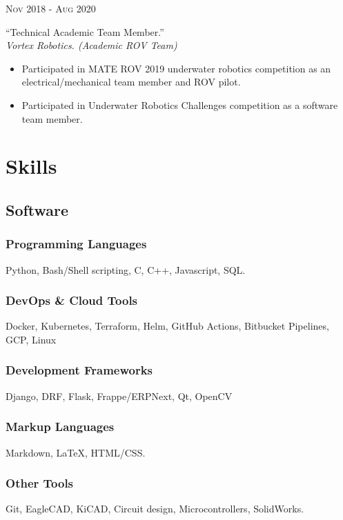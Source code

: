 \documentclass[a4paper]{article}
\newcommand{\entry}[4]{   %
	\begin{center}
		\begin{minipage}[c]{0.2\linewidth}  %
			\vfill
			\hfill  %
			\textsc{#1}  %
			\vfill
		\end{minipage}
		\hfill\vline\hfill  %
		\begin{minipage}[c]{0.75\linewidth}
			\textrm{``#2''} \\
			\textit{#3} \\
			\footnotesize{#4}
		\end{minipage}
	\end{center}
}
\newcommand{\blist}[1]{  %
    \vspace{-\topsep}
    \renewcommand\labelitemi{\tiny$\bullet$}
    \begin{itemize}[leftmargin=3.5mm, noitemsep]
        #1
    \end{itemize}
}
\begin{document}
		\entry{Nov 2018 - Aug 2020}
			{Technical Academic Team Member.}
			{Vortex Robotics. (Academic ROV Team)}
            {
                \blist{
                    \item Participated in MATE ROV 2019 underwater robotics competition as an electrical/mechanical team member and ROV pilot.
                    \item Participated in Underwater Robotics Challenges competition as a software team member.
                }
            }

	\section{Skills}
        \subsection{Software}
			\subsubsection{Programming Languages}
			Python, Bash/Shell scripting, C, C++, Javascript, SQL.
            \subsubsection{DevOps \& Cloud Tools}
            Docker, Kubernetes, Terraform, Helm, GitHub Actions, Bitbucket Pipelines, GCP, Linux
            \subsubsection{Development Frameworks}
            Django, DRF, Flask, Frappe/ERPNext, Qt, OpenCV
			\subsubsection{Markup Languages}
			Markdown, {\LaTeX}, HTML/CSS.
			\subsubsection{Other Tools}
			Git, EagleCAD, KiCAD, Circuit design, Microcontrollers, SolidWorks.

\end{document}
